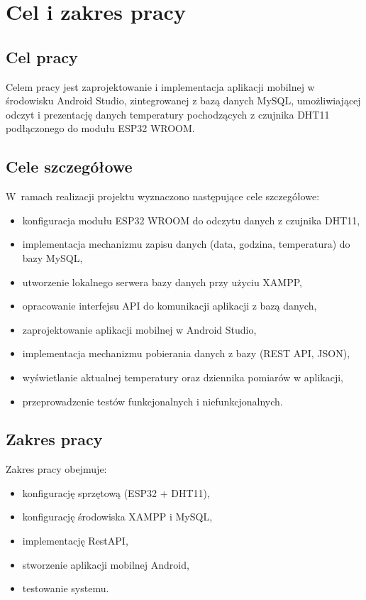 \chapter{Cel i zakres pracy}

\section{Cel pracy}
Celem pracy jest zaprojektowanie i implementacja aplikacji mobilnej w środowisku Android Studio, zintegrowanej z bazą danych MySQL, umożliwiającej odczyt i prezentację danych temperatury pochodzących z czujnika DHT11 podłączonego do modułu ESP32 WROOM.

\section{Cele szczegółowe}
W~ramach realizacji projektu wyznaczono następujące cele szczegółowe:
\begin{itemize}
    \item konfiguracja modułu ESP32 WROOM do odczytu danych z czujnika DHT11,
    \item implementacja mechanizmu zapisu danych (data, godzina, temperatura) do bazy MySQL,
    \item utworzenie lokalnego serwera bazy danych przy użyciu XAMPP,
    \item opracowanie interfejsu API do komunikacji aplikacji z bazą danych,
    \item zaprojektowanie aplikacji mobilnej w Android Studio,
    \item implementacja mechanizmu pobierania danych z bazy (REST API, JSON),
    \item wyświetlanie aktualnej temperatury oraz dziennika pomiarów w aplikacji,
    \item przeprowadzenie testów funkcjonalnych i niefunkcjonalnych.
\end{itemize}

\section{Zakres pracy}
Zakres pracy obejmuje:
\begin{itemize}
    \item konfigurację sprzętową (ESP32 + DHT11),
    \item konfigurację środowiska XAMPP i MySQL,
    \item implementację RestAPI,
    \item stworzenie aplikacji mobilnej Android,
    \item testowanie systemu.
\end{itemize}